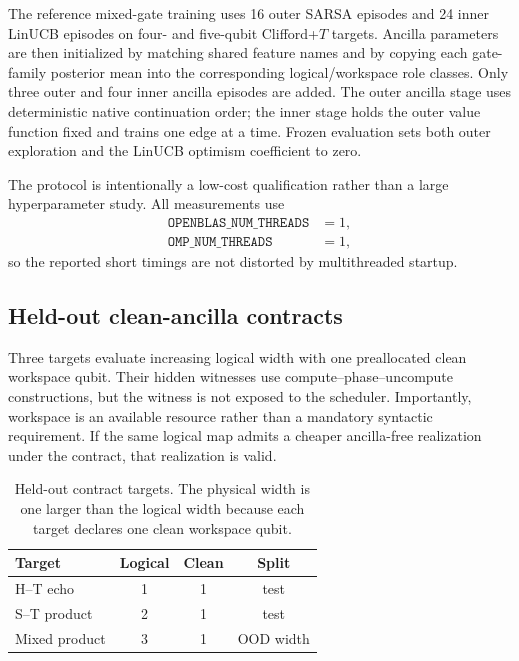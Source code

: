 The reference mixed-gate training uses 16 outer SARSA episodes and 24 inner LinUCB episodes on four- and five-qubit Clifford+$T$ targets. Ancilla parameters are then initialized by matching shared feature names and by copying each gate-family posterior mean into the corresponding logical/workspace role classes. Only three outer and four inner ancilla episodes are added. The outer ancilla stage uses deterministic native continuation order; the inner stage holds the outer value function fixed and trains one edge at a time. Frozen evaluation sets both outer exploration and the LinUCB optimism coefficient to zero.

The protocol is intentionally a low-cost qualification rather than a large hyperparameter study. All measurements use
\begin{equation}
\begin{aligned}
\texttt{OPENBLAS\_NUM\_THREADS}&=1,\\
\texttt{OMP\_NUM\_THREADS}&=1,
\end{aligned}
\end{equation}
so the reported short timings are not distorted by multithreaded startup.

\subsection{Held-out clean-ancilla contracts}

Three targets evaluate increasing logical width with one preallocated clean workspace qubit. Their hidden witnesses use compute--phase--uncompute constructions, but the witness is not exposed to the scheduler. Importantly, workspace is an available resource rather than a mandatory syntactic requirement. If the same logical map admits a cheaper ancilla-free realization under the contract, that realization is valid.

\begin{table}[t]
\caption{Held-out contract targets. The physical width is one larger than the logical width because each target declares one clean workspace qubit.}
\label{tab:ancilla-targets}
\centering
\begin{tabular}{lccc}
\toprule
Target & Logical & Clean & Split\\
\midrule
H--T echo & 1 & 1 & test\\
S--T product & 2 & 1 & test\\
Mixed product & 3 & 1 & OOD width\\
\bottomrule
\end{tabular}
\end{table}

